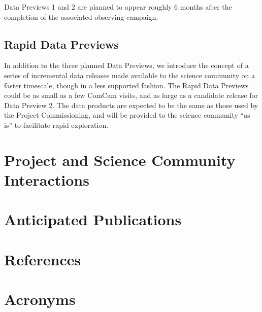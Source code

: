 \documentclass[SE,authoryear,toc]{lsstdoc}
\begin{document}
Data Previews 1 and 2 are planned to appear roughly 6 months after the completion of the associated observing campaign.

\subsection{Rapid Data Previews}

In addition to the three planned Data Previews, we introduce the concept of a series of incremental data releases made available to the science community on a faster timescale, though in a less supported fashion. 
The Rapid Data Previews could be as small as a few ComCam visits, and as large as a candidate release for Data Preview 2. 
The data products are expected to be the same as those used by the Project Commissioning, and will be provided to the science community ``as is'' to facilitate rapid exploration.


\section{Project and Science Community Interactions}



\section{Anticipated Publications}

\appendix
\section{References} \label{sec:bib}
\renewcommand{\refname}{} %


\section{Acronyms} \label{sec:acronyms}

\end{document}

